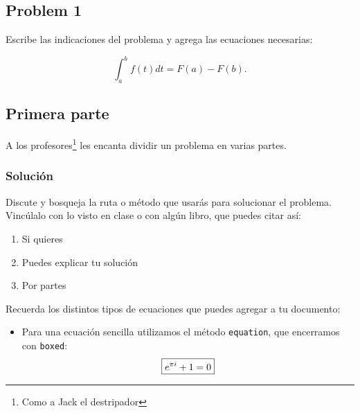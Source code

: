 \documentclass{assignment}
\date{\today}                                   %
\begin{document}
\begin{problem}

\section{Problem 1}

\noindent Escribe las indicaciones del problema y agrega las ecuaciones necesarias:

\begin{equation}\label{eq:TeoremaFundamental}
    \int_a^b f(t)dt = F(a)-F(b).
\end{equation}

\subsection{Primera parte}

\noindent A los profesores\footnote{Como a Jack el destripador} les encanta dividir un problema en varias partes.

\subsubsection*{Solución}

\noindent Discute y bosqueja la ruta o método que usarás para solucionar el problema. Vincúlalo con lo visto en clase o con algún libro, que puedes citar así: \cite{GustavoLopez}

\begin{enumerate}
    \item Si quieres

    \item Puedes explicar tu solución

    \item Por partes
\end{enumerate}

\noindent Recuerda los distintos tipos de ecuaciones que puedes agregar a tu documento:

\begin{itemize}
    \item Para una ecuación sencilla utilizamos el método \texttt{equation}, que encerramos con \texttt{boxed}:
    \begin{equation}\label{eq:Sencilla}
        \boxed{             %
        e^{\pi i} + 1 = 0
        }
    \end{equation}


\end{itemize}
\end{problem}
\end{document}

